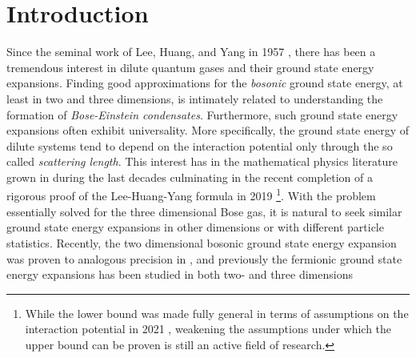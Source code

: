  \chapter{Introduction}
Since the seminal work of Lee, Huang, and Yang in 1957 \cite{lee1957eigenvalues, lee1957many, huang1957quantum}, there has been a tremendous interest in dilute quantum gases and their ground state energy expansions. Finding good approximations for the \emph{bosonic} ground state energy, at least in two and three dimensions, is intimately related to understanding the formation of \emph{Bose-Einstein condensates}. Furthermore, such ground state energy expansions often exhibit universality. More specifically, the ground state energy of dilute systems tend to depend on the interaction potential only through the so called \emph{scattering length}. This interest has in the mathematical physics literature grown in during the last decades culminating in the recent completion of a rigorous proof of the Lee-Huang-Yang formula in 2019 \cite{yau2009second,fournais2020energy}\footnote{While the lower bound was made fully general in terms of assumptions on the interaction potential in 2021 \cite{fournais2021energy}, weakening the assumptions under which the upper bound can be proven is still an active field of research. }. With the problem essentially solved for the three dimensional Bose gas, it is natural to seek similar ground state energy expansions in other dimensions or with different particle statistics. Recently, the two dimensional bosonic ground state energy expansion was proven to analogous precision in \cite{fournais2022ground}, and previously the fermionic ground state energy expansions has been studied in both two- and three dimensions \cite{lieb2005ground}

